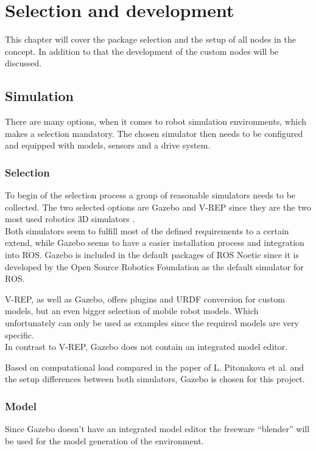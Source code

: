 \chapter{Selection and development}
\label{Selection}

This chapter will cover the package selection and the setup of all nodes in the concept. In addition to that the development of the custom nodes will be discussed.



\section{Simulation}
There are many options, when it comes to robot simulation environments, which makes a selection mandatory. The chosen simulator then needs to be configured and equipped with models, sensors and a drive system.

\subsection{Selection}
To begin of the selection process a group of reasonable simulators needs to be collected. The two selected options are Gazebo and V-REP since they are the two most used robotics 3D simulators \cite{SimComp}.\\

Both simulators seem to fulfill most of the defined requirements to a certain extend, while Gazebo seems to have a easier installation process and integration into ROS. Gazebo is included in the default packages of ROS Noetic since it is developed by the Open Source Robotics Foundation as the default simulator for ROS\cite{ROSPkg}.

V-REP, as well as Gazebo, offers plugins and URDF conversion for custom models, but an even bigger selection of mobile robot models. Which unfortunately can only be used as examples since the required models are very specific.\\
In contrast to V-REP, Gazebo does not contain an integrated model editor.

Based on computational load compared in the paper of L. Pitonakova et al. and the setup differences between both simulators, Gazebo is chosen for this project.

\subsection{Model}
Since Gazebo doesn't have an integrated model editor the freeware ``blender'' will be used for the model generation of the environment.

